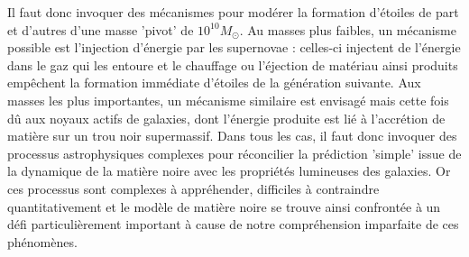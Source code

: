 Il faut donc invoquer des mécanismes pour modérer la formation d'étoiles de part et d'autres d'une masse 'pivot' de $10^{10} M_\odot$. Au masses plus faibles, un mécanisme possible est l'injection d'énergie par les supernovae : celles-ci injectent de l'énergie dans le gaz qui les entoure et le chauffage ou l'éjection de matériau ainsi produits empêchent la formation immédiate d'étoiles de la génération suivante. Aux masses les plus importantes, un mécanisme similaire est envisagé mais cette fois dû aux noyaux actifs de galaxies, dont l'énergie produite est lié à l'accrétion de matière sur un trou noir supermassif. Dans tous les cas, il faut donc invoquer des processus astrophysiques complexes pour réconcilier la prédiction 'simple' issue de la dynamique de la matière noire avec les propriétés lumineuses des galaxies. Or ces processus sont complexes à appréhender, difficiles à contraindre quantitativement et le modèle de matière noire se trouve ainsi confrontée à un défi particulièrement important à cause de notre compréhension imparfaite de ces phénomènes.

